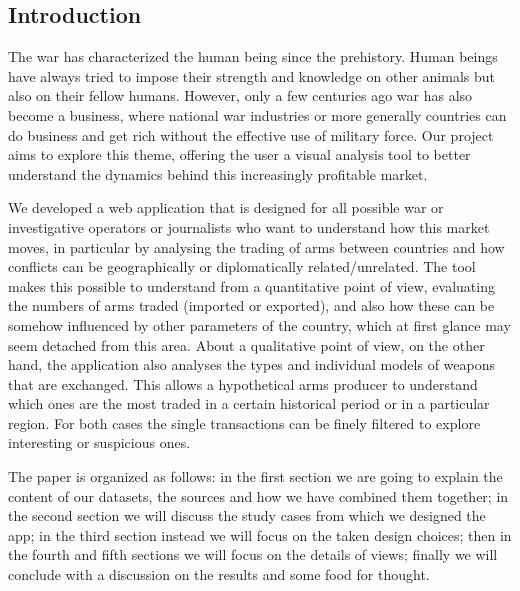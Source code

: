 \documentclass{article}
\begin{document}
\begin{multicols}{2}

\section*{Introduction}
%
The war has characterized the human being since the prehistory. Human beings have always tried to impose their strength and knowledge on other animals but also on their fellow humans. However, only a few centuries ago war has also become a business, where national war industries or more generally countries can do business and get rich without the effective use of military force. Our project aims to explore this theme, offering the user a visual analysis tool to better understand the dynamics behind this increasingly profitable market.

We developed a web application that is designed for all possible war or investigative operators or journalists who want to understand how this market moves, in particular by analysing the trading of arms between countries and how conflicts can be geographically or diplomatically related/unrelated. The tool makes this possible to understand from a quantitative point of view, evaluating the numbers of arms traded (imported or exported), and also how these can be somehow influenced by other parameters of the country, which at first glance may seem detached from this area. 
About a qualitative point of view, on the other hand, the application also analyses the types and individual models of weapons that are exchanged. This allows a hypothetical arms producer to understand which ones are the most traded in a certain historical period or in a particular region. 
For both cases the single transactions can be finely filtered to explore interesting or suspicious ones.

The paper is organized as follows: in the first section we are going to explain the content of our datasets, the sources and how we have combined them together; in the second section we will discuss the study cases from which we designed the app; in the third section instead we will focus on the taken design choices; then in the fourth and fifth sections we will focus on the details of views; finally we will conclude with a discussion on the results and some food for thought.


\end{multicols}
\end{document}
